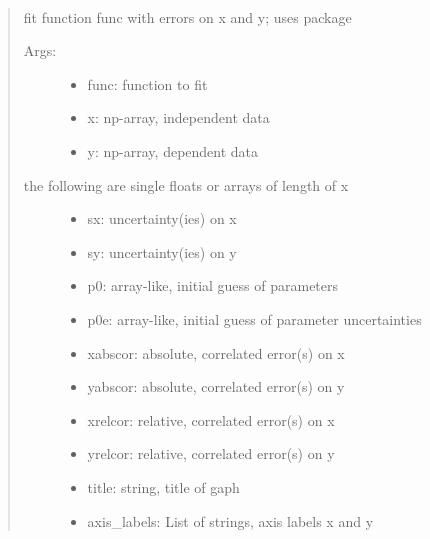 \documentclass[letterpaper,10pt,english]{sphinxmanual}
\begin{document}
\begin{fulllineitems}
\label{\detokenize{index:PhyPraKit.PhyPraKit.kFit}}~\begin{quote}

fit function func with errors on x and y;
uses package 
\begin{description}
\item[{Args:}] \leavevmode\begin{itemize}
\item {} 
func: function to fit

\item {} 
x:  np-array, independent data

\item {} 
y:  np-array, dependent data

\end{itemize}

\item[{the following are single floats or arrays of length of x}] \leavevmode\begin{itemize}
\item {} 
sx: uncertainty(ies) on x

\item {} 
sy: uncertainty(ies) on y

\item {} 
p0: array-like, initial guess of parameters

\item {} 
p0e: array-like, initial guess of parameter uncertainties

\item {} 
xabscor: absolute, correlated error(s) on x

\item {} 
yabscor: absolute, correlated error(s) on y

\item {} 
xrelcor: relative, correlated error(s) on x

\item {} 
yrelcor: relative, correlated error(s) on y

\item {} 
title:   string, title of gaph

\item {} 
axis\_labels: List of strings, axis labels x and y


\end{itemize}
\end{description}
\end{quote}
\end{fulllineitems}
\end{document}
